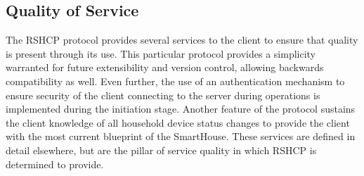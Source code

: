 \subsection{Quality of Service}
\label{sec:pdus:qos}

The RSHCP protocol provides several services to the client to ensure that quality is present through its use. This particular protocol provides a simplicity warranted for future extensibility and version control, allowing backwards compatibility as well. Even further, the use of an authentication mechanism to ensure security of the client connecting to the server during operations is implemented during the initiation stage. Another feature of the protocol sustains the client knowledge of all household device status changes to provide the client with the most current blueprint of the SmartHouse.  These services are defined in detail elsewhere, but are the pillar of service quality in which RSHCP is determined to provide. 